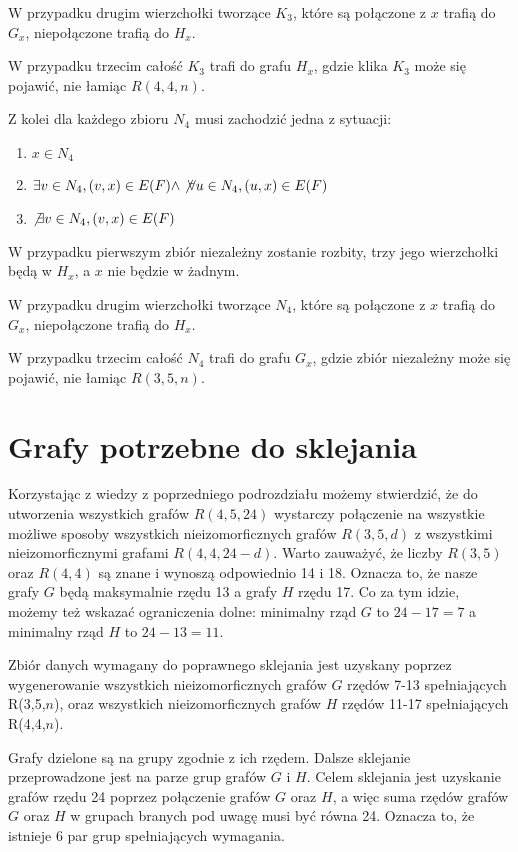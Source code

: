  W przypadku drugim wierzchołki tworzące $K_3$, które są połączone z $x$ trafią do $G_x$, niepołączone trafią do $H_x$.
  
  W przypadku trzecim całość $K_3$ trafi do grafu $H_x$, gdzie klika $K_3$ może się pojawić, nie łamiąc $R(4,4,n)$.

  Z kolei dla każdego zbioru $N_4$ musi zachodzić jedna z sytuacji:

  \begin{enumerate}
    \item $x \in N_4$
    \item $ \exists v \in N_4, (v, x) \in E(F) \land \not \forall u \in N_4, (u,x) \in E(F)$ 
    \item $\not \exists v \in N_4, (v, x) \in E(F)$
  \end{enumerate} 

  W przypadku pierwszym zbiór niezależny zostanie rozbity, trzy jego wierzchołki będą w $H_x$, a $x$ nie będzie w żadnym.
  
  W przypadku drugim wierzchołki tworzące $N_4$, które są połączone z $x$ trafią do $G_x$, niepołączone trafią do $H_x$.
  
  W przypadku trzecim całość $N_4$ trafi do grafu $G_x$, gdzie zbiór niezależny może się pojawić, nie łamiąc $R(3,5,n)$.

\section{Grafy potrzebne do sklejania}

Korzystając z wiedzy z poprzedniego podrozdziału możemy stwierdzić, że do utworzenia wszystkich grafów $R(4,5,24)$ wystarczy połączenie na wszystkie możliwe sposoby
wszystkich nieizomorficznych grafów $R(3,5,d)$ z wszystkimi nieizomorficznymi grafami $R(4,4,24-d)$. 
Warto zauważyć, że liczby $R(3,5)$ oraz $R(4,4)$ są znane i wynoszą odpowiednio 14 i 18. Oznacza to, że nasze grafy $G$ będą maksymalnie rzędu 13 a grafy $H$ rzędu 17. Co za tym idzie, możemy też wskazać ograniczenia dolne:
minimalny rząd $G$ to $24-17=7$ a minimalny rząd $H$ to $24-13 = 11$.  

Zbiór danych wymagany do poprawnego sklejania jest uzyskany poprzez wygenerowanie wszystkich nieizomorficznych grafów $G$ rzędów 7-13 spełniających R(3,5,$n$), oraz wszystkich nieizomorficznych grafów $H$ rzędów 11-17 spełniających R(4,4,$n$).

Grafy dzielone są na grupy zgodnie z ich rzędem. Dalsze sklejanie przeprowadzone jest na parze grup grafów $G$ i $H$. Celem sklejania jest uzyskanie grafów rzędu 24 poprzez połączenie grafów $G$ oraz $H$, a więc suma rzędów grafów $G$ oraz $H$ w grupach branych pod uwagę musi być równa 24. Oznacza to, że istnieje 6 par grup spełniających wymagania.

